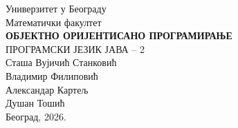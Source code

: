 \documentclass[11pt,a4paper,openright,twoside]{memoir}
\begin{document}
\frontmatter
\begin{titlingpage}
  \begin{center}
    {\Large Универзитет у Београду}\\
    {\large Математички факултет}\\[3cm]
    {\Huge\bfseries ОБЈЕКТНО ОРИЈЕНТИСАНО ПРОГРАМИРАЊЕ}\\[0.8cm]
    {\LARGE ПРОГРАМСКИ ЈЕЗИК ЈАВА -- 2}\\[\fill]\vspace*{2cm}
    {\Large Сташа Вујичић Станковић}\\[0.15cm]
    {\Large Владимир Филиповић}\\[0.15cm]
    {\Large Александар Картељ}\\[0.15cm]
    {\Large Душан Тошић}\\[\fill]
    {\large Београд, 2026.}
  \end{center}
\end{titlingpage}

\tableofcontents
\clearpage

\mainmatter

\end{document}
